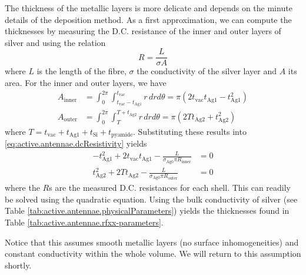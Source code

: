 The thickness of the metallic layers is more delicate and depends on the 
minute details of the deposition method. 
As a first approximation,  we can compute the thicknesses by measuring
the D.C. resistance of the inner and outer layers of silver and
using the relation \cite[p.~204]{CHE1989}
  \begin{equation}
    \label{eq:active.antennae.dcResistivity}
    R = \frac{L}{\sigma A}
  \end{equation}
where $L$ is the length of the fibre, $\sigma$ the conductivity of the silver
layer and $A$ its area. For the inner and outer layers, we have
  \begin{align}
    A_\text{inner}	&= \int_0^{2\pi}\int_{t_\text{vac}-t_\text{Ag1}}^{t_\text{vac}}r\,dr d\theta= \pi\left(2t_\text{vac}t_\text{Ag1}-t_\text{Ag1}^2\right)	\\
    A_\text{outer}	&= \int_0^{2\pi}\int_T^{T+t_\text{Ag2}}r\,dr d\theta = \pi\left(2Tt_\text{Ag2}+t_\text{Ag2}^2\right)
  \end{align}
where $T=t_\text{vac}+t_\text{Ag1}+t_\text{Si}+t_\text{pyamide}$. 
Substituting these results into \eqref{eq:active.antennae.dcResistivity}
yields
  \begin{subequations}
  \label{eq:active.antennae.thickGeneralEquations}
  \begin{align}  
   -t_\text{Ag1}^2 + 2t_\text{vac}t_\text{Ag1}-\frac{L}{\sigma_\text{Ag0}\pi R_\text{inner}}	&=0	\\
   t_\text{Ag2}^2 + 2Tt_\text{Ag2}-\frac{L}{\sigma_\text{Ag0}\pi R_\text{outer}}			&=0
  \end{align}
  \end{subequations}
where the $R$s are the measured D.C. resistances for each shell. 
This can readily be solved using the quadratic equation. Using the bulk conductivity
of silver (see Table \ref{tab:active.antennae.physicalParameters}) yields the
thicknesses found in Table \ref{tab:active.antennae.rfxx-parameters}.

Notice that this assumes smooth metallic layers (no surface inhomogeneities) and
constant conductivity within the whole volume. We will return to this assumption
shortly. 

